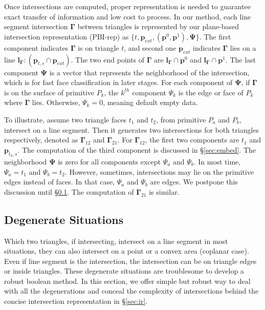 \documentclass[10pt,journal,compsoc]{IEEEtran}
\begin{document}
Once intersections are computed, proper representation is needed to guarantee exact transfer of information and low cost to process. In our method, each line segment intersection $\bm{\Gamma}$ between triangles is represented by our plane-based intersection representation (PBI-rep) as $\{t, \bm{p}_{ext}, (\bm{p}^0, \bm{p}^1),\bm{\Psi}\}$. The first component indicates $\bm{\Gamma}$ is on triangle $t$, and second one $\bm{p}_{ext}$ indicates $\bm{\Gamma}$ lies on a line $\bm{l}_{\bm{\Gamma}}\colon(\bm{p}_{t, s} \cap \bm{p}_{ext})$. The two end points of $\bm{\Gamma}$ are $\bm{l}_{\bm{\Gamma}}\cap\bm{p}^0$ and $\bm{l}_{\bm{\Gamma}}\cap\bm{p}^1$. The last component $\bm{\Psi}$ is a vector that represents the neighborhood of the intersection, which is for fast face classification in later stages. For each component of $\bm{\Psi}$, if $\bm{\Gamma}$ is on the surface of primitive $P_k$, the $k^{th}$ component $\Psi_{k}$ is the edge or face of $P_k$ where $\bm{\Gamma}$ lies. Otherwise, $\Psi_{k}=0$, meaning default empty data.

To illustrate, assume two triangle faces $t_1$ and $t_2$, from primitive $P_a$ and $P_b$, intersect on a line segment. Then it generates two intersections for both triangles respectively, denoted as ${\boldsymbol{\Gamma}}_{12}$ and ${\boldsymbol{\Gamma}}_{21}$. For ${\boldsymbol{\Gamma}}_{12}$, the first two components are $t_1$ and $\bm{p}_{t_2, s}$. The computation of the third component is discussed in \S\ref{sec:embed}. The neighborhood $\bm{\Psi}$ is zero for all components except $\Psi_a$ and $\Psi_b$. In most time, $\Psi_a=t_1$ and $\Psi_b=t_2$. However, sometimes, intersections may lie on the primitive edges instead of faces. In that case, $\Psi_a$ and $\Psi_b$ are edges. We postpone this discussion until \S\ref{sec:degenerate}. The computation of ${\boldsymbol{\Gamma}}_{21}$ is similar.


\subsection{Degenerate Situations}
\label{sec:degenerate}

Which two triangles, if intersecting, intersect on a line segment in most situations, they can also intersect on a point or a convex area (coplanar case). Even if line segment is the intersection, the intersection can be on triangle edges or inside triangles. These degenerate situations are troublesome to develop a robust boolean method. In this section, we offer simple but robust way to deal with all the degenerations and conceal the complexity of intersections behind the concise intersection representation in \S\ref{sec:ir}.
\end{document}

